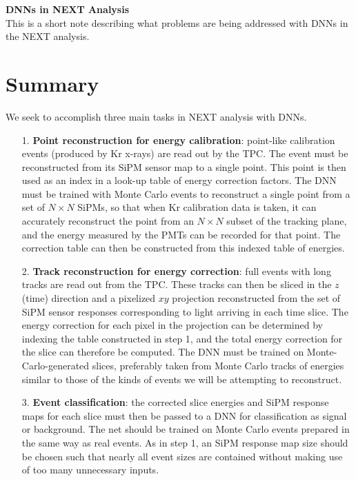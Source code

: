 \documentclass[a4paper,11pt]{article}
\begin{document}
 
	
{\noindent\Large\textbf{DNNs in NEXT Analysis}}\\

\noindent This is a short note describing what problems are being addressed with DNNs in the NEXT analysis.

\section{Summary}\label{sec:summary}
\noindent We seek to accomplish three main tasks in NEXT analysis with DNNs.

\begin{enumerate}
	\item[1.] \textbf{Point reconstruction for energy calibration}: point-like calibration events (produced by Kr x-rays) are read out by the TPC.  The event must be reconstructed from its SiPM sensor map to a single point.  This point is then used as an index in a look-up table of energy correction factors.  The DNN must be trained with Monte Carlo events to reconstruct a single point from a set of $N \times N$ SiPMs, so that when Kr calibration data is taken, it can accurately reconstruct the point from an $N \times N$ subset of the tracking plane, and the energy measured by the PMTs can be recorded for that point. The correction table can then be constructed from this indexed table of energies.
	\item[2.] \textbf{Track reconstruction for energy correction}: full events with long tracks are read out from the TPC.  These tracks can then be sliced in the $z$ (time) direction and a pixelized $xy$ projection reconstructed from the set of SiPM sensor responses corresponding to light arriving in each time slice.  The energy correction for each pixel in the projection can be determined by indexing the table constructed in step 1, and the total energy correction for the slice can therefore be computed.  The DNN must be trained on Monte-Carlo-generated slices, preferably taken from Monte Carlo tracks of energies similar to those of the kinds of events we will be attempting to reconstruct.
	\item[3.] \textbf{Event classification}: the corrected slice energies and SiPM response maps for each slice must then be passed to a DNN for classification as signal or background. The net should be trained on Monte Carlo events prepared in the same way as real events.  As in step 1, an SiPM response map size should be chosen such that nearly all event sizes are contained without making use of too many unnecessary inputs.
\end{enumerate}
\end{document}

